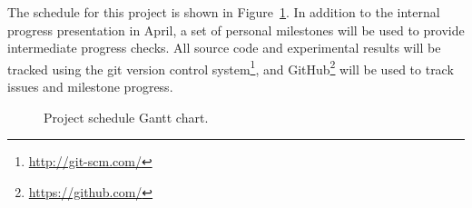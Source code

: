 The schedule for this project is shown in Figure~\ref{fig:gantt}. In
addition to the internal progress presentation in April, a set of
personal milestones will be used to provide intermediate progress
checks. All source code and experimental results will be tracked using
the git version control system\footnote{\url{http://git-scm.com/}},
and GitHub\footnote{\url{https://github.com/}} will be used to track
issues and milestone progress.

\begin{figure}[b]
\makebox[\textwidth][c]{}
\caption{Project schedule Gantt chart.}
\label{fig:gantt}
\end{figure}
